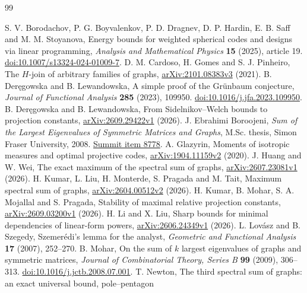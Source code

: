 \documentclass[11pt]{article}
\theoremstyle{remark}\newtheorem{remark}[theorem]{Remark}
\numberwithin{equation}{section}
\begin{document}
\begin{thebibliography}{99}
\raggedright
{}
S. V. Borodachov, P. G. Boyvalenkov, P. D. Dragnev, D. P. Hardin,
E. B. Saff and M. M. Stoyanova,
Energy bounds for weighted spherical codes and designs via linear programming,
\emph{Analysis and Mathematical Physics} \textbf{15} (2025), article 19.
\href{https://doi.org/10.1007/s13324-024-01009-7}{doi:10.1007/s13324-024-01009-7}.
D. M. Cardoso, H. Gomes and S. J. Pinheiro,
The $H$-join of arbitrary families of graphs,
\href{https://arxiv.org/abs/2101.08383v3}{arXiv:2101.08383v3} (2021).
B. Der\k{e}gowska and B. Lewandowska,
A simple proof of the Gr\"unbaum conjecture,
\emph{Journal of Functional Analysis} \textbf{285} (2023), 109950.
\href{https://doi.org/10.1016/j.jfa.2023.109950}{doi:10.1016/j.jfa.2023.109950}.
B. Der\k{e}gowska and B. Lewandowska,
From Sidelnikov--Welch bounds to projection constants,
\href{https://arxiv.org/abs/2609.29422v1}{arXiv:2609.29422v1} (2026).
J. Ebrahimi Boroojeni,
\emph{Sum of the Largest Eigenvalues of Symmetric Matrices and Graphs},
M.Sc. thesis, Simon Fraser University, 2008.
\href{https://summit.sfu.ca/item/8778}{Summit item 8778}.
A. Glazyrin,
Moments of isotropic measures and optimal projective codes,
\href{https://arxiv.org/abs/1904.11159v2}{arXiv:1904.11159v2} (2020).
J. Huang and W. Wei,
The exact maximum of the spectral sum of graphs,
\href{https://arxiv.org/abs/2607.23081v1}{arXiv:2607.23081v1} (2026).
H. Kumar, L. Liu, H. Monterde, S. Pragada and M. Tait,
Maximum spectral sum of graphs,
\href{https://arxiv.org/abs/2604.00512v2}{arXiv:2604.00512v2} (2026).
H. Kumar, B. Mohar, S. A. Mojallal and S. Pragada,
Stability of maximal relative projection constants,
\href{https://arxiv.org/abs/2609.03200v1}{arXiv:2609.03200v1} (2026).
H. Li and X. Liu,
Sharp bounds for minimal dependencies of linear-form powers,
\href{https://arxiv.org/abs/2606.24349v1}{arXiv:2606.24349v1} (2026).
L. Lov\'asz and B. Szegedy,
Szemer\'edi's lemma for the analyst,
\emph{Geometric and Functional Analysis} \textbf{17} (2007), 252--270.
B. Mohar,
On the sum of $k$ largest eigenvalues of graphs and symmetric matrices,
\emph{Journal of Combinatorial Theory, Series B} \textbf{99} (2009), 306--313.
\href{https://doi.org/10.1016/j.jctb.2008.07.001}{doi:10.1016/j.jctb.2008.07.001}.
T. Newton,
The third spectral sum of graphs: an exact universal bound, pole--pentagon

\end{thebibliography}
\end{document}
